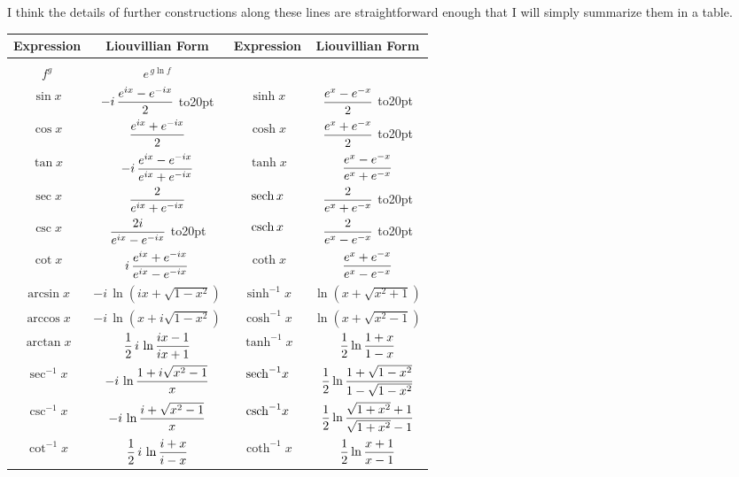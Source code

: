 \endexample

I think the details of further constructions along these lines are
straightforward enough that I will simply summarize them in a table.

\vfill\eject



\def\sech{{\rm sech}}
\def\csch{{\rm csch}}

\begin{center}
\begin{tabular}{c c c c @{\bigskip}}
Expression & \multicolumn{1}{c}{Liouvillian Form} &
Expression & \multicolumn{1}{c}{Liouvillian Form} \\
\hline
& \\
$f^g$ & $\displaystyle e^{\,g \ln f}$ &
 & \\
$\sin x$ & $\displaystyle {-i \,{{e^{ix} - e^{-ix}}\over 2}}$ \vbox to20pt{}&
 $\sinh x$ & $\displaystyle {{e^{x} - e^{-x}}\over 2}$ \vbox to20pt{} \\
$\cos x$ & $\displaystyle {{e^{ix} + e^{-ix}}\over 2}$ &
 $\cosh x$ & $\displaystyle {{e^{x} + e^{-x}}\over 2}$ \vbox to20pt{} \\
$\tan x$ & $\displaystyle {-i \,{{e^{ix}-e^{-ix}}\over {e^{ix}+e^{-ix}}}}$ &
 $\tanh x$ & $\displaystyle {{e^{x}-e^{-x}}\over {e^{x}+e^{-x}}}$ \\

$\sec x$ & $\displaystyle {2\over{e^{ix} + e^{-ix}}}$ &
 $\sech\, x$ & $\displaystyle {2\over{e^{x} + e^{-x}}}$ \vbox to20pt{} \\
$\csc x$ & $\displaystyle {{2i}\over{e^{ix} - e^{-ix}}}$ \vbox to20pt{}&
 $\csch\, x$ & $\displaystyle {2\over{e^{x} - e^{-x}}}$ \vbox to20pt{} \\
$\cot x$ & $\displaystyle {i \,{{e^{ix}+e^{-ix}}\over {e^{ix}-e^{-ix}}}}$ &
 $\coth x$ & $\displaystyle {{e^{x}+e^{-x}}\over {e^{x}-e^{-x}}}$ \\

$\arcsin x$ & $\displaystyle -i \,\ln (ix + \sqrt{1-x^2})$ &
 $\sinh^{-1} x$ & $\displaystyle \ln (x + \sqrt{x^2+1})$ \\
$\arccos x$ & $\displaystyle -i \,\ln (x + i\sqrt{1-x^2})$ &
 $\cosh^{-1} x$ & $\displaystyle \ln (x + \sqrt{x^2-1})$ \\
$\arctan x$ & $\displaystyle {1\over2}\,i\,\ln {{ix-1}\over{ix+1}}$ &
 $\tanh^{-1} x$ & $\displaystyle {1\over2} \ln {{1+x}\over{1-x}}$ \\

$\sec^{-1} x$ & $\displaystyle -i \,\ln {{1 + i\sqrt{x^2-1}}\over{x}}$ &
 $\sech^{-1} x$ & $\displaystyle {1\over2} \ln {{1+\sqrt{1-x^2}}\over{1-\sqrt{1-x^2}}}$ \\
$\csc^{-1} x$ & $\displaystyle -i \,\ln {{i + \sqrt{x^2-1}}\over{x}}$ &
 $\csch^{-1} x$ & $\displaystyle {1\over2} \ln {{\sqrt{1+x^2}+1}\over{\sqrt{1+x^2}-1}}$ \\
$\cot^{-1} x$ & $\displaystyle {1\over2}\,i\,\ln {{i+x}\over{i-x}}$ &
 $\coth^{-1} x$ & $\displaystyle {1\over2} \ln {{x+1}\over{x-1}}$ \\

\end{tabular}
\end{center}

